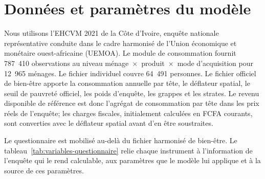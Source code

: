 \documentclass[11pt,a4paper]{article}
\begin{document}
\section{Données et paramètres du modèle}
\label{sec:donnees}

Nous utilisons l'EHCVM 2021 de la Côte d'Ivoire, enquête nationale représentative
conduite dans le cadre harmonisé de l'Union économique et monétaire
ouest-africaine (UEMOA). Le module de consommation fournit
787~410 observations au niveau ménage~$\times$~produit~$\times$~mode
d'acquisition pour 12~965 ménages. Le fichier individuel couvre 64~491 personnes.
Le fichier officiel de bien-être apporte la consommation annuelle par tête, le
déflateur spatial, le seuil de pauvreté officiel, les poids d'enquête, les
grappes et les strates. Le revenu disponible de référence est donc l'agrégat de
consommation par tête dans les prix réels de l'enquête; les charges fiscales,
initialement calculées en FCFA courants, sont converties avec le déflateur
spatial avant d'en être soustraites.

Le questionnaire est mobilisé au-delà du fichier harmonisé de bien-être. Le
tableau~\ref{tab:variables-questionnaire} relie chaque instrument à
l'information de l'enquête qui le rend calculable, aux paramètres que le modèle
lui applique et à la source de ces paramètres.
\end{document}
